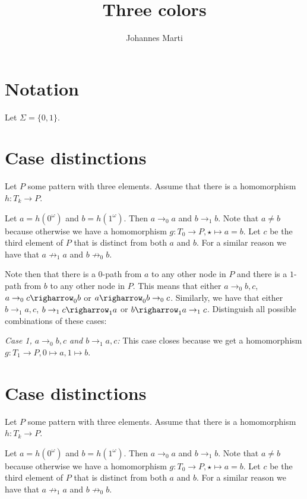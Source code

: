 \documentclass[a4paper]{article}
\title{Three colors}
\author{Johannes Marti}
\newcommand{\first}[1]{\mathsf{first}({#1})}
\newcommand{\last}[1]{\mathsf{last}({#1})}
\newcommand{\case}[2]{\vspace{1ex}\noindent\textit{Case #1, #2:}}
\begin{document}
\maketitle

\section{Notation}

Let $\Sigma = \{0,1\}$.

%

\section{Case distinctions}

Let $P$ some pattern with three elements. Assume that there is a
homomorphism $h : T_k \to P$.

Let $a = h(0^\omega)$ and $b = h(1^\omega)$. Then $a \rightarrow_0 a$
and $b \rightarrow_1 b$. Note that $a \neq b$ because otherwise we have
a homomorphism $g : T_0 \to P, \star \mapsto a=b$. Let $c$ be the third
element of $P$ that is distinct from both $a$ and $b$. For a similar
reason we have that $a \not \rightarrow_1 a$ and $b \not \rightarrow_0
b$.

Note then that there is a $0$-path from $a$ to any other node in $P$ and
there is a $1$-path from $b$ to any other node in $P$. This means that
either $a \rightarrow_0 b,c$, $a \rightarrow_0 c \righarrow_0 b$ or $a
\righarrow_0 b \rightarrow_0 c$. Similarly, we have that either $b
\rightarrow_1 a,c$, $b \rightarrow_1 c \righarrow_1 a$ or $b
\righarrow_1 a \rightarrow_1 c$. Distinguish all possible combinations
of these cases:

\case{1}{$a \rightarrow_0 b,c$ and $b \rightarrow_1 a,c$} This case
closes because we get a homomorphism $g : T_1 \to P, 0 \mapsto a, 1
\mapsto b$.


\section{Case distinctions}

Let $P$ some pattern with three elements. Assume that there is a
homomorphism $h : T_k \to P$.

Let $a = h(0^\omega)$ and $b = h(1^\omega)$. Then $a \rightarrow_0 a$
and $b \rightarrow_1 b$. Note that $a \neq b$ because otherwise we have
a homomorphism $g : T_0 \to P, \star \mapsto a=b$. Let $c$ be the third
element of $P$ that is distinct from both $a$ and $b$. For a similar
reason we have that $a \not \rightarrow_1 a$ and $b \not \rightarrow_0
b$.
\end{document}
